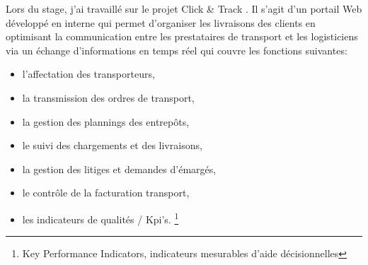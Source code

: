 
	Lors du stage, j'ai travaillé sur le projet Click \& Track . Il s'agit d'un portail Web développé en interne qui permet d'organiser les livraisons des clients en optimisant la communication entre les prestataires de transport et les logisticiens via un échange d'informations en temps réel qui couvre les fonctions suivantes:
	\begin{itemize}
		\item l'affectation des transporteurs,
		\item la transmission des ordres de transport,
		\item la gestion des plannings des entrepôts,
		\item le suivi des chargements et des livraisons,
		\item la gestion des litiges et demandes d'émargés,
		\item le contrôle de la facturation transport,
		\item les indicateurs de qualités / Kpi's. \footnote{Key Performance Indicators, indicateurs mesurables d'aide décisionnelles}
	\end{itemize}